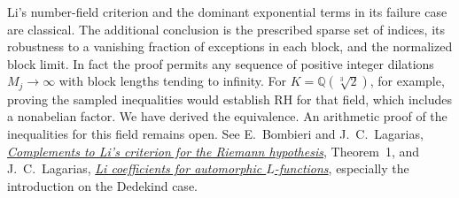 Li's number-field criterion and the dominant exponential terms in
its failure case are classical. The additional conclusion is the
prescribed sparse set of indices, its robustness to a vanishing
fraction of exceptions in each block, and the normalized block limit.
In fact the proof permits any sequence of positive integer dilations
$M_j\to\infty$ with block lengths tending to infinity. For
$K=\mathbb Q(\sqrt[3]{2})$, for example, proving the sampled
inequalities would establish RH for that field, which includes a
nonabelian factor. We have derived the equivalence. An arithmetic proof
of the inequalities for this field remains open.
See E.~Bombieri and J.~C.~Lagarias,
\href{https://websites.umich.edu/lagarias/doc/bombieri.pdf}{\emph{Complements to Li's
criterion for the Riemann hypothesis}}, Theorem~1, and
J.~C.~Lagarias,
\href{https://doi.org/10.5802/aif.2311}{\emph{Li coefficients for automorphic
$L$-functions}}, especially the introduction on the Dedekind case.
